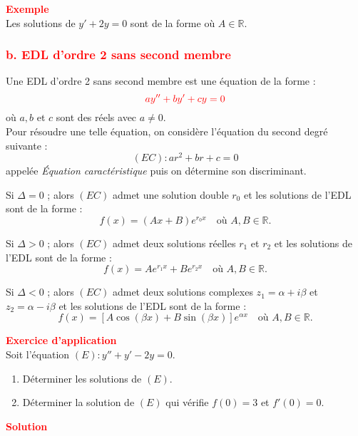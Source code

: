 \documentclass[a4paper,12pt]{article}
\begin{document}
\textbf{\textcolor{red}{Exemple}}\\
Les solutions de $y' + 2y = 0$ sont de la forme  où $A \in \mathbb{R}$.

\vspace{0.5cm}

\subsubsection*{\textcolor{red}{b. EDL d’ordre 2 sans second membre}}
Une EDL d’ordre 2 sans second membre est une équation de la forme :
\[
\textcolor{red}{ay'' + by' + cy = 0}
\]
où $a, b$ et $c$ sont des réels avec $a \neq 0$.\\
Pour résoudre une telle équation, on considère l’équation du second degré suivante : 
\[
\boxed{(EC) : ar^2 + br + c = 0}
\]
appelée \textit{Équation caractéristique} puis on détermine son discriminant.

\vspace{0.5cm}

Si $\Delta = 0$ ; alors $(EC)$ admet une solution double $r_0$ et les solutions de l’EDL sont de la forme :
\[
\boxed{f(x) = (Ax + B)e^{r_0 x}} \quad \text{où } A, B \in \mathbb{R}.
\]

Si $\Delta > 0$ ; alors $(EC)$ admet deux solutions réelles $r_1$ et $r_2$ et les solutions de l’EDL sont de la forme :
\[
\boxed{f(x) = Ae^{r_1 x} + Be^{r_2 x}} \quad \text{où } A, B \in \mathbb{R}.
\]

Si $\Delta < 0$ ; alors $(EC)$ admet deux solutions complexes $z_1 = \alpha + i\beta$ et $z_2 = \alpha - i\beta$ et les solutions de l’EDL sont de la forme :
\[
\boxed{f(x) = [A\cos(\beta x) + B\sin(\beta x)]e^{\alpha x}} \quad \text{où } A, B \in \mathbb{R}.
\]

\vspace{0.5cm}

\textbf{\textcolor{red}{Exercice d'application}}\\
Soit l’équation $(E) : y'' + y' - 2y = 0$.
\begin{enumerate}
    \item Déterminer les solutions de $(E)$.
    \item Déterminer la solution de $(E)$ qui vérifie $f(0) = 3$ et $f'(0) = 0$.
\end{enumerate}

\textbf{\textcolor{red}{Solution}}
\end{document}
